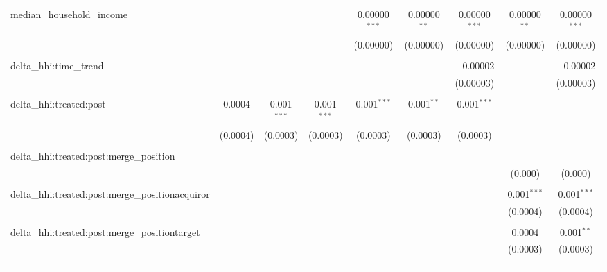 \begin{table}[H]
{\begin{tabular}{@{\extracolsep{5pt}}lcccccccc}
  median\_household\_income &  &  &  & 0.00000$^{***}$ & 0.00000$^{**}$ & 0.00000$^{***}$ & 0.00000$^{**}$ & 0.00000$^{***}$ \\  

   &  &  &  & (0.00000) & (0.00000) & (0.00000) & (0.00000) & (0.00000) \\  

   & & & & & & & & \\  

  delta\_hhi:time\_trend &  &  &  &  &  & $-$0.00002 &  & $-$0.00002 \\  

   &  &  &  &  &  & (0.00003) &  & (0.00003) \\  

   & & & & & & & & \\  

  delta\_hhi:treated:post & 0.0004 & 0.001$^{***}$ & 0.001$^{***}$ & 0.001$^{***}$ & 0.001$^{**}$ & 0.001$^{***}$ &  &  \\  

   & (0.0004) & (0.0003) & (0.0003) & (0.0003) & (0.0003) & (0.0003) &  &  \\  

   & & & & & & & & \\  

  delta\_hhi:treated:post:merge\_position &  &  &  &  &  &  &  &  \\  

   &  &  &  &  &  &  & (0.000) & (0.000) \\  

   & & & & & & & & \\  

  delta\_hhi:treated:post:merge\_positionacquiror &  &  &  &  &  &  & 0.001$^{***}$ & 0.001$^{***}$ \\  

   &  &  &  &  &  &  & (0.0004) & (0.0004) \\  

   & & & & & & & & \\  

  delta\_hhi:treated:post:merge\_positiontarget &  &  &  &  &  &  & 0.0004 & 0.001$^{**}$ \\  

   &  &  &  &  &  &  & (0.0003) & (0.0003) \\  

   & & & & & & & & \\  

 \hline \\[-1.8ex]  


\end{tabular}}
\end{table}
